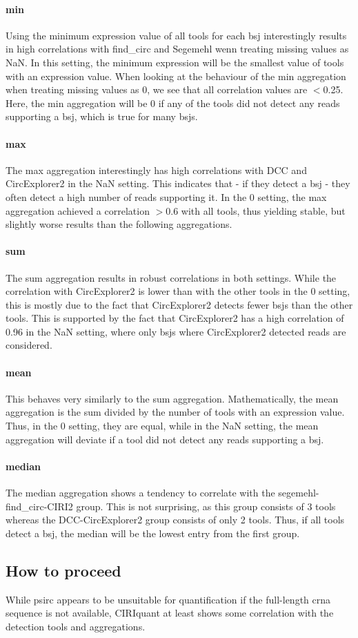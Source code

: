 \paragraph{min}
Using the minimum expression value of all tools for each \gls{bsj}
interestingly results in high correlations with find\_circ and Segemehl wenn
treating missing values as NaN.
In this setting, the minimum expression will be the smallest value of tools
with an expression value.
When looking at the behaviour of the min aggregation when treating missing
values as 0, we see that all correlation values are $<$0.25.
Here, the min aggregation will be 0 if any of the tools did not detect any
reads supporting a \gls{bsj}, which is true for many \gls{bsj}s.

\paragraph{max}
The max aggregation interestingly has high correlations with DCC and
CircExplorer2 in the NaN setting.
This indicates that - if they detect a \gls{bsj} - they often detect a high
number of reads supporting it.
In the 0 setting, the max aggregation achieved a correlation $>$0.6 with all
tools, thus yielding stable, but slightly worse results than the following
aggregations.

\paragraph{sum}
The sum aggregation results in robust correlations in both settings.
While the correlation with CircExplorer2 is lower than with the other tools in
the 0 setting, this is mostly due to the fact that CircExplorer2 detects fewer
\gls{bsj}s than the other tools.
This is supported by the fact that CircExplorer2 has a high correlation of 0.96
in the NaN setting, where only \gls{bsj}s where CircExplorer2 detected reads
are considered.

\paragraph{mean}
This behaves very similarly to the sum aggregation.
Mathematically, the mean aggregation is the sum divided by the number of tools
with an expression value.
Thus, in the 0 setting, they are equal, while in the NaN setting, the mean
aggregation will deviate if a tool did not detect any reads supporting a
\gls{bsj}.

\paragraph{median}
The median aggregation shows a tendency to correlate with the
segemehl-find\_circ-CIRI2 group.
This is not surprising, as this group consists of 3 tools whereas the
DCC-CircExplorer2 group consists of only 2 tools.
Thus, if all tools detect a \gls{bsj}, the median will be the lowest entry from
the first group.

\subsection{How to proceed}

While psirc appears to be unsuitable for quantification if the full-length
\gls{crna} sequence is not available, CIRIquant at least shows some correlation
with the detection tools and aggregations.

